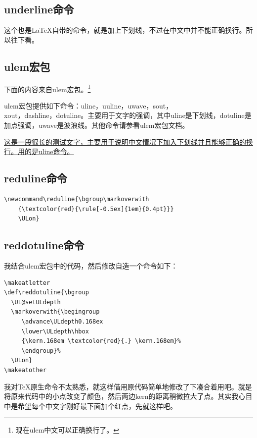 \documentclass[11pt,oneside]{book}
\begin{document}
\begin{common-format}
\subsection{underline命令}
这个也是\LaTeX 自带的命令，就是加上下划线，不过在中文中并不能正确换行。所以往下看。

\subsection{ulem宏包}
下面的内容来自ulem宏包。\footnote{现在ulem中文可以正确换行了。}

ulem宏包提供如下命令：uline，uuline，uwave，sout，\\ xout，dashline，dotuline。主要用于文字的强调，其中uline是下划线，dotuline是加点强调，uwave是波浪线。其他命令请参看ulem宏包文档。

\uline{这是一段很长的测试文字，主要用于说明中文情况下加入下划线并且能够正确的换行。用的是uline命令。}


\subsection{reduline命令}
\begin{Verbatim}
\newcommand\reduline{\bgroup\markoverwith
	{\textcolor{red}{\rule[-0.5ex]{1em}{0.4pt}}}
	\ULon}
\end{Verbatim}


\subsection{reddotuline命令}
我结合ulem宏包中的代码，然后修改自造一个命令如下：
\begin{Verbatim}
\makeatletter
\def\reddotuline{\bgroup 
  \UL@setULdepth
  \markoverwith{\begingroup
     \advance\ULdepth0.168ex 
     \lower\ULdepth\hbox
     {\kern.168em \textcolor{red}{.} \kern.168em}%
     \endgroup}%
  \ULon}
\makeatother
\end{Verbatim}

我对\TeX 原生命令不太熟悉，就这样借用原代码简单地修改了下凑合着用吧。就是将原来代码中的小点改变了颜色，然后两边kern的距离稍微拉大了点。其实我心目中是希望每个中文字刚好最下面加个红点，先就这样吧。



\end{common-format}
\end{document}
